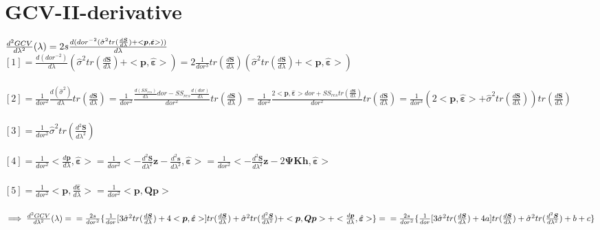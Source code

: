 \documentclass[11pt,twoside]{report}
\begin{document}
\section{GCV-II-derivative}
$ \frac{d^2GCV}{d\lambda^2}(\lambda) = 2s\frac{d({dor}^{-2}(\hat{\sigma}^2tr(\frac{d\mathbold{S}}{d\lambda}) + <\mathbold{p}, \hat{\mathbold{\varepsilon}}>))}{d\lambda}\\$
\\
$ [1] = \frac{d(dor^{-2})}{d\lambda}(\hat{\sigma}^2tr(\frac{d\mathbold{S}}{d\lambda}) + <\boldsymbol{p}, \hat{\mathbold{\varepsilon}}>) =  2\frac{1}{dor^3}tr(\frac{d\mathbold{S}}{d\lambda})(\hat{\sigma}^2tr(\frac{d\mathbold{S}}{d\lambda}) + <\boldsymbol{p}, \hat{\mathbold{\varepsilon}}>)$\\
\\
$ [2] = \frac{1}{dor^2}\frac{d(\hat{\sigma}^2)}{d\lambda}tr(\frac{d\mathbold{S}}{d\lambda}) = \frac{1}{dor^2}\frac{\frac{d(SS_{res})}{d\lambda}dor - SS_{res}\frac{d(dor)}{d\lambda}}{dor^2}tr(\frac{d\mathbold{S}}{d\lambda}) = \frac{1}{dor^2}\frac{2<\mathbold{p}, \hat{\mathbold{\varepsilon}}>dor + SS_{res}tr(\frac{d\mathbold{S}}{d\lambda})}{dor^2}tr(\frac{d\mathbold{S}}{d\lambda}) = \frac{1}{dor^3}(2<\mathbold{p}, \hat{\mathbold{\varepsilon}}> + \hat{\sigma}^2tr(\frac{d\mathbold{S}}{d\lambda}))tr(\frac{d\mathbold{S}}{d\lambda})$\\
\\
$ [3] =  \frac{1}{dor^2}\hat{\sigma}^2tr(\frac{d^2\mathbold{S}}{d\lambda^2})$\\
\\
$ [4] = \frac{1}{dor^2}<\frac{d\mathbold{p}}{d\lambda}, \hat{\mathbold{\varepsilon}}> =  \frac{1}{dor^2}<-\frac{d^2\mathbold{S}}{d\lambda^2}\mathbold{z} -\frac{d^2\mathbold{s}}{d\lambda^2}, \hat{\mathbold{\varepsilon}}> =  \frac{1}{dor^2}<-\frac{d^2\mathbold{S}}{d\lambda^2}\mathbold{z}  -2\boldsymbol{\Psi} \textbf{K} \textbf{h}, \hat{\mathbold{\varepsilon}}> $\\
\\
$ [5] =  \frac{1}{dor^2}<\mathbold{p}, \frac{d\hat{\mathbold{\varepsilon}}}{d\lambda}> = \frac{1}{dor^2}<\mathbold{p},\mathbold{Q}\mathbold{p}>$\\
\\
$\implies  \frac{d^2GCV}{d\lambda^2}(\lambda) =
\\ =\frac{2s}{dor^2}\{\frac{1}{dor}[3\hat{\sigma}^2tr(\frac{d\mathbold{S}}{d\lambda}) + 4<\mathbold{p}, \hat{\mathbold{\varepsilon}}>]tr(\frac{d\mathbold{S}}{d\lambda}) + \hat{\sigma}^2tr(\frac{d^2\mathbold{S}}{d\lambda^2}) + <\mathbold{p},\mathbold{Q} \mathbold{p}> + <\frac{d\mathbold{p}}{d\lambda}, \hat{\mathbold{\varepsilon}}>\} = \\
=\frac{2s}{dor^2}\{\frac{1}{dor}[3\hat{\sigma}^2tr(\frac{d\mathbold{S}}{d\lambda}) + 4a]tr(\frac{d\mathbold{S}}{d\lambda}) + \hat{\sigma}^2tr(\frac{d^2\mathbold{S}}{d\lambda^2}) +b+c\}$
\end{document}
